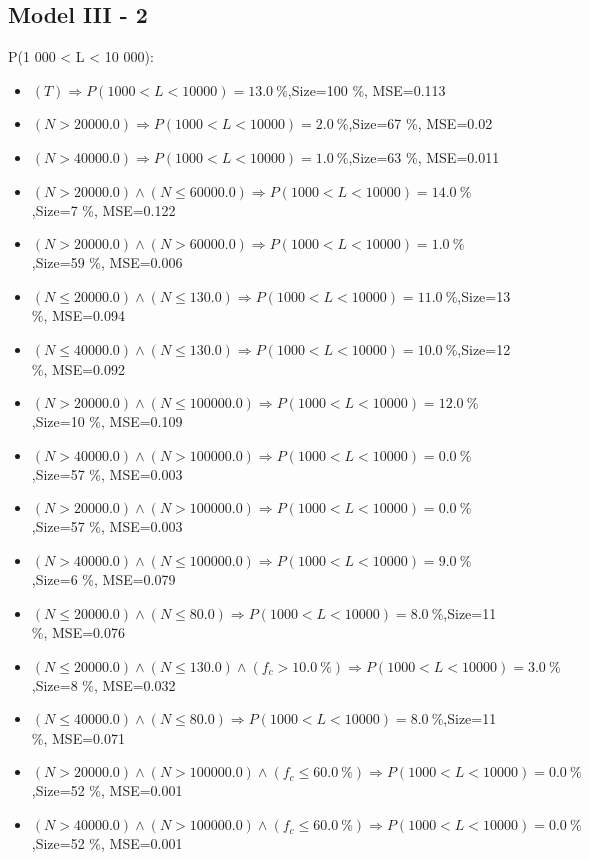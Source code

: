 \documentclass[numbered]{CSL}
\begin{document}
\subsection{Model III - 2}
P(1 000 < L < 10 000):
\begin{itemize}
\item $(T) \Rightarrow P(1 000 < L < 10 000) = 13.0~\%$,\hfill Size=100 \%, MSE=0.113
\item $(N > 20000.0) \Rightarrow P(1 000 < L < 10 000) = 2.0~\%$,\hfill Size=67 \%, MSE=0.02
\item $(N > 40000.0) \Rightarrow P(1 000 < L < 10 000) = 1.0~\%$,\hfill Size=63 \%, MSE=0.011
\item $(N > 20000.0) \land (N \leq 60000.0) \Rightarrow P(1 000 < L < 10 000) = 14.0~\%$,\hfill Size=7 \%, MSE=0.122
\item $(N > 20000.0) \land (N > 60000.0) \Rightarrow P(1 000 < L < 10 000) = 1.0~\%$,\hfill Size=59 \%, MSE=0.006
\item $(N \leq 20000.0) \land (N \leq 130.0) \Rightarrow P(1 000 < L < 10 000) = 11.0~\%$,\hfill Size=13 \%, MSE=0.094
\item $(N \leq 40000.0) \land (N \leq 130.0) \Rightarrow P(1 000 < L < 10 000) = 10.0~\%$,\hfill Size=12 \%, MSE=0.092
\item $(N > 20000.0) \land (N \leq 100000.0) \Rightarrow P(1 000 < L < 10 000) = 12.0~\%$,\hfill Size=10 \%, MSE=0.109
\item $(N > 40000.0) \land (N > 100000.0) \Rightarrow P(1 000 < L < 10 000) = 0.0~\%$,\hfill Size=57 \%, MSE=0.003
\item $(N > 20000.0) \land (N > 100000.0) \Rightarrow P(1 000 < L < 10 000) = 0.0~\%$,\hfill Size=57 \%, MSE=0.003
\item $(N > 40000.0) \land (N \leq 100000.0) \Rightarrow P(1 000 < L < 10 000) = 9.0~\%$,\hfill Size=6 \%, MSE=0.079
\item $(N \leq 20000.0) \land (N \leq 80.0) \Rightarrow P(1 000 < L < 10 000) = 8.0~\%$,\hfill Size=11 \%, MSE=0.076
\item $(N \leq 20000.0) \land (N \leq 130.0) \land (f_c > 10.0~\%) \Rightarrow P(1 000 < L < 10 000) = 3.0~\%$,\hfill Size=8 \%, MSE=0.032
\item $(N \leq 40000.0) \land (N \leq 80.0) \Rightarrow P(1 000 < L < 10 000) = 8.0~\%$,\hfill Size=11 \%, MSE=0.071
\item $(N > 20000.0) \land (N > 100000.0) \land (f_c \leq 60.0~\%) \Rightarrow P(1 000 < L < 10 000) = 0.0~\%$,\hfill Size=52 \%, MSE=0.001
\item $(N > 40000.0) \land (N > 100000.0) \land (f_c \leq 60.0~\%) \Rightarrow P(1 000 < L < 10 000) = 0.0~\%$,\hfill Size=52 \%, MSE=0.001

\end{itemize}
\end{document}
